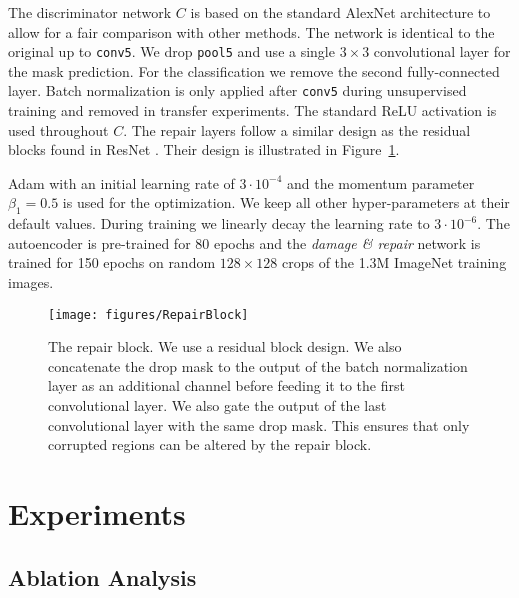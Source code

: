 \documentclass[10pt,twocolumn,letterpaper]{article}
\begin{document}
The discriminator network $C$ is based on the standard AlexNet architecture \cite{krizhevsky2012imagenet} to allow for a fair comparison with other methods. The network is identical to the original up to \texttt{conv5}. We drop \texttt{pool5} and use a single $3\times3$ convolutional layer for the mask prediction. For the classification we remove the second fully-connected layer. Batch normalization is only applied after \texttt{conv5} during unsupervised training and removed in transfer experiments. The standard ReLU activation is used throughout $C$.
The repair layers follow a similar design as the residual blocks found in ResNet \cite{he2016deep}. Their design is illustrated in Figure~\ref{fig:repairblock}.

Adam \cite{kingma2014adam} with an initial learning rate of $3\cdot10^{-4}$ and the momentum parameter $\beta_1=0.5$ is used for the optimization. We keep all other hyper-parameters at their default values. During training we linearly decay the learning rate to $3\cdot10^{-6}$. The autoencoder is pre-trained for 80 epochs and the \emph{damage \& repair} network is trained for 150 epochs on random $128\times128$ crops of the 1.3M ImageNet \cite{imagenet_cvpr09} training images.

\begin{figure}[t]
	\begin{center}
  	\texttt{[image: figures/RepairBlock]}
 	\end{center}
   \caption{The repair block. We use a residual block design. We also concatenate the drop mask to the output of the batch normalization layer as an additional channel before feeding it to the first convolutional layer. We also gate the output of the last convolutional layer with the same drop mask. This ensures that only corrupted regions can be altered by the repair block.}
\label{fig:repairblock}
\end{figure}


\section{Experiments}


\subsection{Ablation Analysis}
\end{document}
